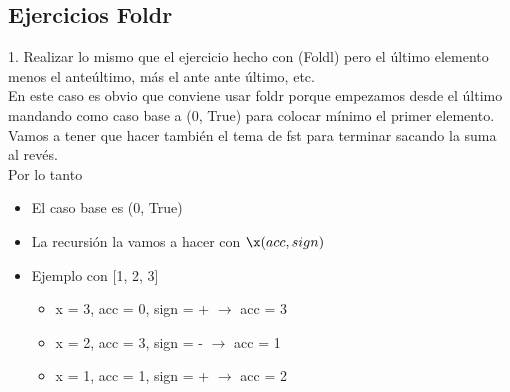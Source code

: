 \documentclass[10pt,a4paper]{article}
\begin{document}
\subsection*{Ejercicios Foldr}
\label{subsec:foldr_ejercicios}
1. Realizar lo mismo que el ejercicio hecho con (Foldl) pero el último elemento menos el anteúltimo, más el ante ante último, etc. \\
En este caso es obvio que conviene usar foldr porque empezamos desde el último mandando como caso base a (0, True) para colocar mínimo el primer elemento. \\
Vamos a tener que hacer también el tema de fst para terminar sacando la suma al revés. \\
Por lo tanto 
\begin{itemize}
    \item El caso base es (0, True)
    \item La recursión la vamos a hacer con $\x (acc, sign)$
    \item Ejemplo con [1, 2, 3]
    \begin{itemize}
        \item x = 3, acc = 0, sign = + $\rightarrow$ acc = 3
        \item x = 2, acc = 3, sign = - $\rightarrow$ acc = 1
        \item x = 1, acc = 1, sign = + $\rightarrow$ acc = 2
    \end{itemize}
\end{itemize}
\end{document}
